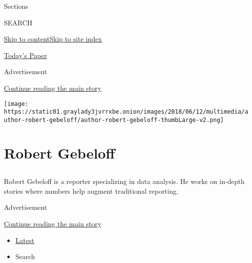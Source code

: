 Sections

SEARCH

\protect\hyperlink{site-content}{Skip to
content}\protect\hyperlink{site-index}{Skip to site index}

\href{https://myaccount.nytimes3xbfgragh.onion/auth/login?response_type=cookie\&client_id=vi}{}

\href{https://www.nytimes3xbfgragh.onion/section/todayspaper}{Today's
Paper}

Advertisement

\protect\hyperlink{after-top}{Continue reading the main story}

\texttt{[image: https://static01.graylady3jvrrxbe.onion/images/2018/06/12/multimedia/author-robert-gebeloff/author-robert-gebeloff-thumbLarge-v2.png]}

\hypertarget{robert-gebeloff}{%
\section{Robert Gebeloff}\label{robert-gebeloff}}

\subsection{}

Robert Gebeloff is a reporter specializing in data analysis. He works on
in-depth stories where numbers help augment traditional reporting.

Advertisement

\protect\hyperlink{after-mid1}{Continue reading the main story}

\begin{itemize}
\tightlist
\item
  \protect\hyperlink{stream-panel}{Latest}
\item
  Search
\end{itemize}

